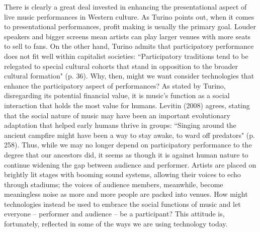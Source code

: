 There is clearly a great deal invested in enhancing the presentational aspect of live music performances in Western culture. As Turino points out, when it comes to presentational performances, profit making is usually the primary goal. Louder speakers and bigger screens mean artists can play larger venues with more seats to sell to fans. On the other hand, Turino admits that participatory performance does not fit well within capitalist societies: ``Participatory traditions tend to be relegated to special cultural cohorts that stand in opposition to the broader cultural formation" (p. 36). Why, then, might we want consider technologies that enhance the participatory aspect of performances? As stated by Turino, disregarding its potential financial value, it is music's function as a social interaction that holds the most value for humans. Levitin (2008) agrees, stating that the social nature of music may have been an important evolutionary adaptation that helped early humans thrive in groups: ``Singing around the ancient campfire might have been a way to stay awake, to ward off predators" (p. 258). Thus, while we may no longer depend on participatory performance to the degree that our ancestors did, it seems as though it is against human nature to continue widening the gap between audience and performer. Artists are placed on brightly lit stages with booming sound systems, allowing their voices to echo through stadiums; the voices of audience members, meanwhile, become meaningless noise as more and more people are packed into venues. How might technologies instead be used to embrace the social functions of music and let everyone -- performer and audience -- be a participant? This attitude is, fortunately, reflected in some of the ways we are using technology today.

